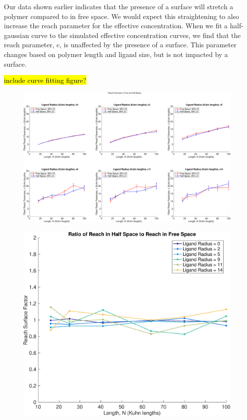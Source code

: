 \documentclass[../../AdvancementSummary.tex]{subfiles}
\begin{document}
Our data shown earlier indicates that the presence of a surface will stretch a polymer compared to in free space. We would expect this straightening to also increase the reach parameter for the effective concentration. When we fit a half-gaussian curve to the simulated effective concentration curves, we find that the reach parameter, c, is unaffected by the presence of a surface. This parameter changes based on polymer length and ligand size, but is not impacted by a surface. 


\hl{include curve fitting figure?}

\begin{figure}[H]
    \begin{center}
        		\includegraphics[width=\linewidth]{ResultsFigures/ReachSurfaceFactor/ReachParameterFreeHalfAxisEqual.eps}
        \caption{}
    \end{center}
\end{figure}

\begin{figure}[H]
    \begin{center}
        		\includegraphics[width=0.7\linewidth]{ResultsFigures/ReachSurfaceFactor/ReachSurfaceFactor.eps}
        \caption{}
    \end{center}
\end{figure}
\end{document}
